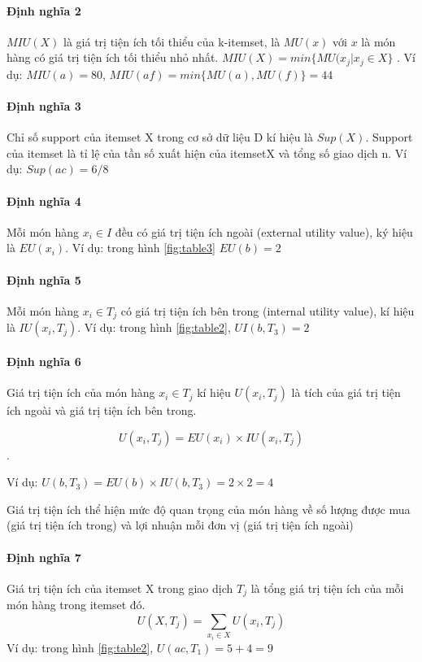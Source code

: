 \paragraph{Định nghĩa 2} $MIU(X)$ là giá trị tiện ích tối thiểu của k-itemset, là $MU(x)$ với $x$ là món hàng có giá trị tiện ích tối thiểu nhỏ nhất. $MIU(X) = min \{MU(x_j|x_j \in X\}$ . Ví dụ: $MIU(a) = 80$, $MIU(af) = min\{MU(a), MU(f)\} = 44$


\paragraph{Định nghĩa 3} Chỉ số support của itemset X trong cơ sở dữ liệu D kí hiệu là $Sup(X)$. Support của itemset là tỉ lệ của tần số xuất hiện của itemsetX và tổng số giao dịch n. Ví dụ: $Sup(ac) = 6/8$

\paragraph{Định nghĩa 4} Mỗi món hàng $x_i \in I$ đều có giá trị tiện ích ngoài (external utility value), ký hiệu là $EU(x_i)$. Ví dụ: trong hình \ref{fig:table3} $EU(b) = 2$

\paragraph{Định nghĩa 5} Mỗi món hàng $x_i \in T_j$ có giá trị tiện ích bên trong (internal utility value), kí hiệu là $IU(x_i, T_j)$. Ví dụ: trong hình \ref{fig:table2}, $UI(b, T_3) = 2$

\paragraph{Định nghĩa 6} Giá trị tiện ích của món hàng $x_i \in T_j$ kí hiệu $U(x_i, T_j)$ là tích của giá trị tiện ích ngoài và giá trị tiện ích bên trong. 

$$ U(x_i, T_j) = EU(x_i) \times IU(x_i, T_j) $$ .

Ví dụ: $U(b, T_3) = EU(b) \times IU(b, T_3) = 2 \times 2 = 4$

Giá trị tiện ích thể hiện mức độ quan trọng của món hàng về số lượng được mua (giá trị tiện ích trong) và lợi nhuận mỗi đơn vị (giá trị tiện ích ngoài)

\paragraph{Định nghĩa 7} Giá trị tiện ích của itemset X trong giao dịch $T_j$ là tổng giá trị tiện ích của mỗi món hàng trong itemset đó. 
$$U(X, T_j) = \sum_{x_i \in X} U(x_i, T_j)$$
Ví dụ: trong hình \ref{fig:table2}, $U(ac, T_1) = 5 + 4 = 9$

